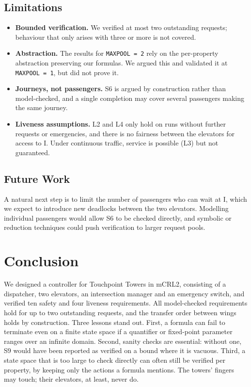 \subsection{Limitations}
\label{subsec:limitations}

\begin{itemize}
  \item \textbf{Bounded verification.} We verified at most two outstanding requests; behaviour that only arises with three or more is not covered.
  \item \textbf{Abstraction.} The results for \texttt{MAXPOOL = 2} rely on the per-property abstraction preserving our formulas. We argued this and validated it at \texttt{MAXPOOL = 1}, but did not prove it.
  \item \textbf{Journeys, not passengers.} S6 is argued by construction rather than model-checked, and a single completion may cover several passengers making the same journey.
  \item \textbf{Liveness assumptions.} L2 and L4 only hold on runs without further requests or emergencies, and there is no fairness between the elevators for access to I. Under continuous traffic, service is possible (L3) but not guaranteed.
\end{itemize}

\subsection{Future Work}
\label{subsec:future-work}

A natural next step is to limit the number of passengers who can wait at I, which we expect to introduce new deadlocks between the two elevators. Modelling individual passengers would allow S6 to be checked directly, and symbolic or reduction techniques could push verification to larger request pools.

\section{Conclusion}
\label{sec:conclusion}

We designed a controller for Touchpoint Towers in mCRL2, consisting of a dispatcher, two elevators, an intersection manager and an emergency switch, and verified ten safety and four liveness requirements. All model-checked requirements hold for up to two outstanding requests, and the transfer order between wings holds by construction. Three lessons stand out. First, a formula can fail to terminate even on a finite state space if a quantifier or fixed-point parameter ranges over an infinite domain. Second, sanity checks are essential: without one, S9 would have been reported as verified on a bound where it is vacuous. Third, a state space that is too large to check directly can often still be verified per property, by keeping only the actions a formula mentions. The towers' fingers may touch; their elevators, at least, never do.

